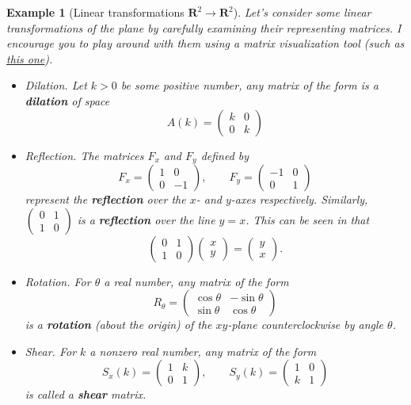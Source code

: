 \documentclass[12pt]{article}
\numberwithin{equation}{subsection}
\numberwithin{figure}{subsection}
\theoremstyle{note}
\newtheorem{example}[subsection]{Example}
\begin{document}
\begin{example}[Linear transformations $\mathbf{R}^2\to\mathbf{R}^2$]
\label{ex-2x2} Let's consider some linear transformations of the plane by carefully examining their representing matrices. I encourage you to play around with them using a matrix visualization tool (such as \href{https://epiplexis.xyz/a/fxh/matrix_visualizer\#2d}{this one}).

\begin{itemize}

\item Dilation. Let $k>0$ be some positive number, any matrix of the form is a \textbf{dilation} of space \[ A(k)=\begin{pmatrix} k & 0 \\ 0 & k \end{pmatrix}\] 

\item Reflection. The matrices $F_x$ and $F_y$ defined by \[ F_x = \begin{pmatrix} 1 & 0 \\ 0 & -1 \end{pmatrix}, \qquad F_y=\begin{pmatrix} -1 & 0 \\ 0 & 1 \end{pmatrix}\] represent the \textbf{reflection} over the $x$- and $y$-axes respectively. Similarly, $\begin{pmatrix} 0 & 1 \\ 1 & 0 \end{pmatrix}$ is a \textbf{reflection} over the line $y=x$. This can be seen in that \[\begin{pmatrix} 0 & 1 \\ 1 & 0 \end{pmatrix}\begin{pmatrix} x \\ y \end{pmatrix} = \begin{pmatrix} y \\ x\end{pmatrix}.\]

\item Rotation. For $\theta$ a real number, any matrix of the form \[ R_{\theta} = \begin{pmatrix} \cos \theta & -\sin \theta \\ \sin\theta & \cos \theta\end{pmatrix}\] is a \textbf{rotation} (about the origin) of the $xy$-plane counterclockwise by angle $\theta$.

\item Shear. For $k$ a nonzero real number, any matrix of the form \[ S_x(k) =\begin{pmatrix} 1 & k \\ 0 & 1\end{pmatrix}, \qquad S_y(k)=\begin{pmatrix} 1 & 0 \\ k & 1 \end{pmatrix} \] is called a \textbf{shear} matrix. 
\end{itemize}
\end{example}
\end{document}
